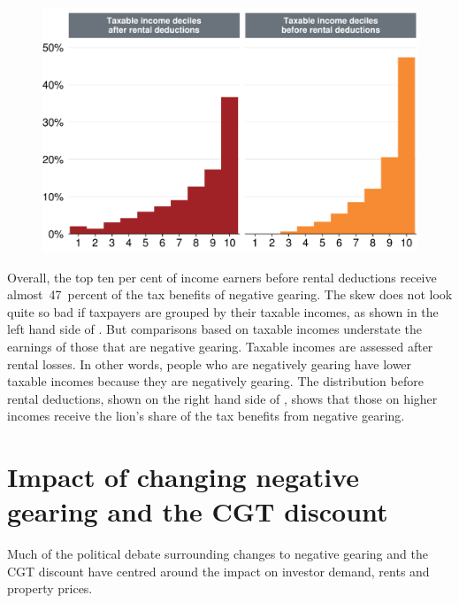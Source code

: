 \documentclass{grattan}\usepackage[]{graphicx}\usepackage[]{color}
\begin{document}
\begin{figure}
\includegraphics[width=\columnwidth]{CGT-NG-atlas//Benefit-NG-before-after-deductions-1}

\end{figure}

Overall, the top ten per cent of income earners before rental deductions receive almost~47~percent 
of the tax benefits of negative gearing. The skew does not look quite so bad if taxpayers are grouped by their taxable incomes, as shown in the left hand side of . But comparisons based on taxable incomes understate the earnings of those that are negative gearing. Taxable incomes are assessed after rental losses. In other words, people who are negatively gearing have lower taxable incomes because they are negatively gearing. The distribution before rental deductions, shown on the right hand side of , shows that those on higher incomes receive the lion's share of the tax benefits from negative gearing.

\chapter{Impact of changing negative gearing and the CGT discount}
Much of the political debate surrounding changes to negative gearing and the CGT discount have centred around the impact on investor demand, rents and property prices. 
\end{document}
